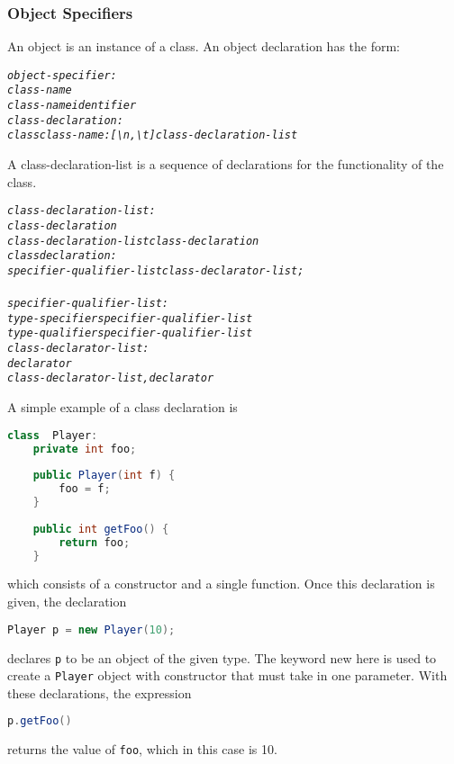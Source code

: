 \documentclass[12pt]{report}
\begin{document}
\subsubsection{Object Specifiers}
An object is an instance of a class. An object declaration has the form:
\begin{alltt}
         \textit{object-specifier:}
              \textit{class-name}
              \textit{class-name identifier}
         \textit{class-declaration:}
              \textit{class class-name: [\textbackslash n, \textbackslash t] class-declaration-list}
\end{alltt}
A class-declaration-list is a sequence of declarations for the functionality of the class.
\begin{alltt}
         \textit{class-declaration-list:}
              \textit{class-declaration}
              \textit{class-declaration-list class-declaration}
         \textit{class declaration:}
              \textit{specifier-qualifier-list class-declarator-list;}
              \textit{}
         \textit{specifier-qualifier-list:}
              \textit{type-specifier specifier-qualifier-list}
              \textit{type-qualifier specifier-qualifier-list}
         \textit{class-declarator-list:}
              \textit{declarator}
              \textit{class-declarator-list, declarator}
\end{alltt}
A simple example of a class declaration is
\begin{lstlisting}[language=Java,label=some-code,caption=Class declaration]
class  Player: 
	private int foo;
	
	public Player(int f) {
		foo = f;
	}
	
	public int getFoo() {
		return foo;
	}
\end{lstlisting}
\begin{doublespace}which consists of a constructor and a single function. Once this declaration is given, the declaration
\end{doublespace}
\begin{lstlisting}[language=Java,label=some-code,caption=Object declaration]
Player p = new Player(10);
\end{lstlisting}
\begin{doublespace}
declares \texttt{p} to be an object of the given type. The keyword new here is used to create a \texttt{Player} object with constructor that must take in one parameter. With these declarations, the expression
\end{doublespace}
\begin{lstlisting}[language=Java,label=some-code,caption=Returns foo]
p.getFoo()
\end{lstlisting}
returns the value of \texttt{foo}, which in this case is 10. 
\end{document}
